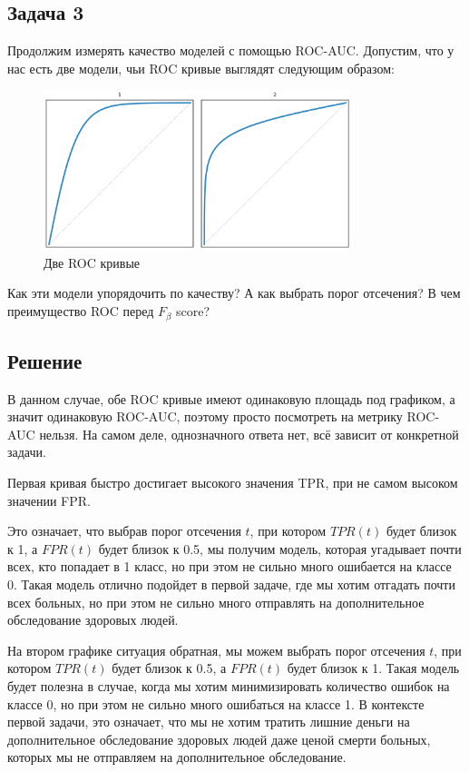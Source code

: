 \subsection*{Задача 3}
Продолжим измерять качество моделей с помощью ROC-AUC. Допустим, что у нас есть две модели, чьи ROC кривые выглядят следующим образом:
\begin{figure}[h]
    \centering
    \includegraphics[width=0.8\textwidth]{chapters/feature_selection/roc_curves_comparison_2.png}
    \caption{Две ROC кривые}
\end{figure}
Как эти модели упорядочить по качеству? А как выбрать порог отсечения? В чем преимущество ROC перед $F_{\beta}$ score?

\subsection*{Решение}
В данном случае, обе ROC кривые имеют одинаковую площадь под графиком, а значит одинаковую ROC-AUC, поэтому просто посмотреть на метрику ROC-AUC нельзя.
На самом деле, однозначного ответа нет, всё зависит от конкретной задачи.

Первая кривая быстро достигает высокого значения TPR, при не самом высоком значении FPR.

Это означает, что выбрав порог отсечения $t$, при котором $TPR(t)$ будет близок к 1, а $FPR(t)$ будет близок к 0.5, мы получим модель,
которая угадывает почти всех, кто попадает в 1 класс, но при этом не сильно много ошибается на классе 0.
Такая модель отлично подойдет в первой задаче, где мы хотим отгадать почти всех больных, но при этом не сильно много отправлять на дополнительное обследование здоровых людей.

На втором графике ситуация обратная, мы можем выбрать порог отсечения $t$, при котором $TPR(t)$ будет близок к 0.5, а $FPR(t)$ будет близок к 1.
Такая модель будет полезна в случае, когда мы хотим минимизировать количество ошибок на классе 0, но при этом не сильно много ошибаться на классе 1.
В контексте первой задачи, это означает, что мы не хотим тратить лишние деньги на дополнительное обследование здоровых людей даже ценой смерти больных, которых мы не отправляем на дополнительное обследование.

